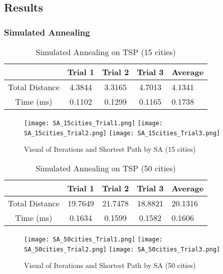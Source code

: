 \documentclass{article}
\begin{document}
\subsection{Results}
\subsubsection{Simulated Annealing}
\begin{table}[H]
\centering
\begin{tabular}{|c|c|c|c|l|}
\hline
\textit{}      & Trial 1 & Trial 2 & Trial 3 & Average \\ \hline
Total Distance & 4.3844  & 3.3165  & 4.7013  & 4.1341  \\ \hline
Time (ms)      & 0.1102  & 0.1299  & 0.1165  & 0.1738  \\ \hline
\end{tabular}
\caption{Simulated Annealing on TSP (15 cities)}
\label{tab:my-table}
\end{table}

\begin{figure} [H]
    \centering
    \texttt{[image: SA\_15cities\_Trial1.png]}\hfill
    \texttt{[image: SA\_15cities\_Trial2.png]}\hfill
    \texttt{[image: SA\_15cities\_Trial3.png]}
    \caption{Visual of Iterations and Shortest Path by SA (15 cities)}
    \label{fig:my_label}
\end{figure}

\begin{table}[H]
\centering
\begin{tabular}{|c|c|c|c|l|}
\hline
\textit{}      & Trial 1 & Trial 2 & Trial 3 & Average \\ \hline
Total Distance & 19.7649 & 21.7478 & 18.8821 & 20.1316 \\ \hline
Time (ms)      & 0.1634  & 0.1599  & 0.1582  & 0.1606  \\ \hline
\end{tabular}
\caption{Simulated Annealing on TSP (50 cities)}
\label{tab:my-table}
\end{table}

\begin{figure} [H]
    \centering
    \texttt{[image: SA\_50cities\_Trial1.png]}\hfill
    \texttt{[image: SA\_50cities\_Trial2.png]}\hfill
    \texttt{[image: SA\_50cities\_Trial3.png]}
    \caption{Visual of Iterations and Shortest Path by SA (50 cities)}
    \label{fig:my_label}
\end{figure}
\end{document}
